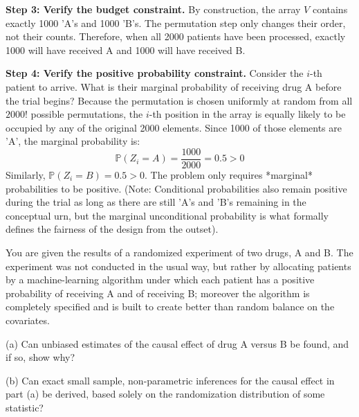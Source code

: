 \begin{solution}
\textbf{Step 3: Verify the budget constraint.}
By construction, the array $V$ contains exactly 1000 'A's and 1000 'B's. The permutation step only changes their order, not their counts. Therefore, when all 2000 patients have been processed, exactly 1000 will have received A and 1000 will have received B.

\textbf{Step 4: Verify the positive probability constraint.}
Consider the $i$-th patient to arrive. What is their marginal probability of receiving drug A before the trial begins?
Because the permutation is chosen uniformly at random from all $2000!$ possible permutations, the $i$-th position in the array is equally likely to be occupied by any of the original 2000 elements.
Since 1000 of those elements are 'A', the marginal probability is:
\[ \mathbb{P}(Z_i = A) = \frac{1000}{2000} = 0.5 > 0 \]
Similarly, $\mathbb{P}(Z_i = B) = 0.5 > 0$.
The problem only requires *marginal* probabilities to be positive. (Note: Conditional probabilities also remain positive during the trial as long as there are still 'A's and 'B's remaining in the conceptual urn, but the marginal unconditional probability is what formally defines the fairness of the design from the outset).
\end{solution}

\begin{exercise}\label{probability:2023:6}
You are given the results of a randomized experiment of two drugs, A and B. The experiment was not conducted in the usual way, but rather by allocating patients by a machine-learning algorithm under which each patient has a positive probability of receiving A and of receiving B; moreover the algorithm is completely specified and is built to create better than random balance on the covariates.

(a) Can unbiased estimates of the causal effect of drug A versus B be found, and if so, show why?

(b) Can exact small sample, non-parametric inferences for the causal effect in part (a) be derived, based solely on the randomization distribution of some statistic?
\end{exercise}

